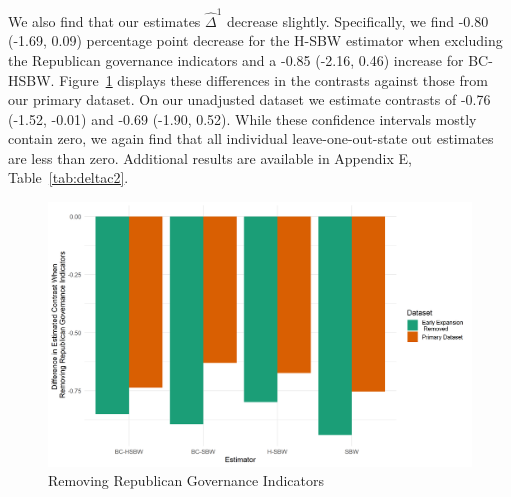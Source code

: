 \documentclass[aoas]{imsart}
\theoremstyle{plain}
\theoremstyle{remark}
\begin{document}
We also find that our estimates $\hat{\Delta}^1$ decrease slightly. Specifically, we find -0.80 (-1.69, 0.09) percentage point decrease for the H-SBW estimator when excluding the Republican governance indicators and a -0.85 (-2.16, 0.46) increase for BC-HSBW. Figure~\ref{fig:repub} displays these differences in the contrasts against those from our primary dataset. On our unadjusted dataset we estimate contrasts of -0.76 (-1.52, -0.01) and -0.69 (-1.90, 0.52). While these confidence intervals mostly contain zero, we again find that all individual leave-one-out-state out estimates are less than zero. Additional results are available in Appendix E, Table~\ref{tab:deltac2}. 

\begin{figure}[H]
\begin{center}
    \caption{Removing Republican Governance Indicators}
    \label{fig:repub}
    \includegraphics[scale=0.6]{01_Plots/repub-diff-c1c2.png}
\end{center}
\end{figure}
\end{document}
